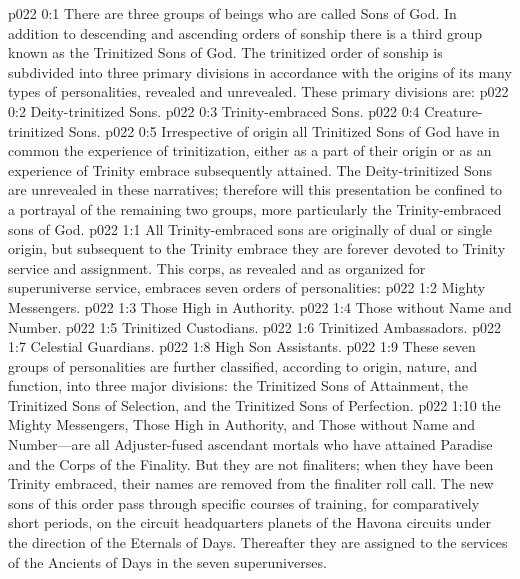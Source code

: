 \author{Mighty Messenger}
\vs p022 0:1 There are three groups of beings who are called Sons of God. In addition to descending and ascending orders of sonship there is a third group known as the Trinitized Sons of God. The trinitized order of sonship is subdivided into three primary divisions in accordance with the origins of its many types of personalities, revealed and unrevealed. These primary divisions are:
\pc \vs p022 0:2 \bibnobreakspace Deity\hyp{}trinitized Sons.
\vs p022 0:3 \bibnobreakspace Trinity\hyp{}embraced Sons.
\vs p022 0:4 \bibnobreakspace Creature\hyp{}trinitized Sons.
\vs p022 0:5 Irrespective of origin all Trinitized Sons of God have in common the experience of trinitization, either as a part of their origin or as an experience of Trinity embrace subsequently attained. The Deity\hyp{}trinitized Sons are unrevealed in these narratives; therefore will this presentation be confined to a portrayal of the remaining two groups, more particularly the Trinity\hyp{}embraced sons of God.
\vs p022 1:1 All Trinity\hyp{}embraced sons are originally of dual or single origin, but subsequent to the Trinity embrace they are forever devoted to Trinity service and assignment. This corps, as revealed and as organized for superuniverse service, embraces seven orders of personalities:
\pc \vs p022 1:2 \bibnobreakspace Mighty Messengers.
\vs p022 1:3 \bibnobreakspace Those High in Authority.
\vs p022 1:4 \bibnobreakspace Those without Name and Number.
\vs p022 1:5 \bibnobreakspace Trinitized Custodians.
\vs p022 1:6 \bibnobreakspace Trinitized Ambassadors.
\vs p022 1:7 \bibnobreakspace Celestial Guardians.
\vs p022 1:8 \bibnobreakspace High Son Assistants.
\pc \vs p022 1:9 These seven groups of personalities are further classified, according to origin, nature, and function, into three major divisions: the Trinitized Sons of Attainment, the Trinitized Sons of Selection, and the Trinitized Sons of Perfection.
\pc \vs p022 1:10 the Mighty Messengers, Those High in Authority, and Those without Name and Number---are all Adjuster\hyp{}fused ascendant mortals who have attained Paradise and the Corps of the Finality. But they are not finaliters; when they have been Trinity embraced, their names are removed from the finaliter roll call. The new sons of this order pass through specific courses of training, for comparatively short periods, on the circuit headquarters planets of the Havona circuits under the direction of the Eternals of Days. Thereafter they are assigned to the services of the Ancients of Days in the seven superuniverses.
